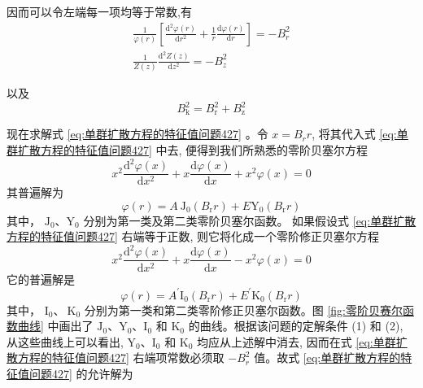 \documentclass{Sichuan Normal University}
\begin{document}
因而可以令左端每一项均等于常数,有
\begin{align}
\frac{1}{\varphi(r)}\left[\frac{\mathrm{d}^2 \varphi(r)}{\mathrm{d} r^2}+\frac{1}{r} \frac{\mathrm{d} \varphi(r)}{\mathrm{d} r}\right]=-B_r^2 \label{eq:单群扩散方程的特征值问题427}\\
\frac{1}{Z(z)} \frac{\mathrm{d}^2 Z(z)}{\mathrm{d} z^2}=-B_z^2\label{eq:单群扩散方程的特征值问题428}
\end{align}

以及
\begin{equation}
B_{\mathrm{k}}^2=B_{\mathrm{r}}^2+B_{\mathrm{z}}^2
\end{equation}

现在求解式 \eqref{eq:单群扩散方程的特征值问题427} 。令 $x=B_r r$, 将其代入式 \eqref{eq:单群扩散方程的特征值问题427} 中去, 便得到我们所熟悉的零阶贝塞尔方程
\begin{equation}
x^2 \frac{\mathrm{d}^2 \varphi(x)}{\mathrm{d} x^2}+x \frac{\mathrm{d} \varphi(x)}{\mathrm{d} x}+x^2 \varphi(x)=0
\end{equation}
其普遍解为
\begin{equation}
\varphi(r)=A \mathrm{~J}_0\left(B_{\mathrm{r}} r\right)+E \mathrm{Y}_0\left(B_{\mathrm{r}} r\right)
\end{equation}其中， $\mathrm{J}_0 、 \mathrm{Y}_0$ 分别为第一类及第二类零阶贝塞尔函数。
如果假设式 \eqref{eq:单群扩散方程的特征值问题427} 右端等于正数, 则它将化成一个零阶修正贝塞尔方程
\begin{equation}
x^2 \frac{\mathrm{d}^2 \varphi(x)}{\mathrm{d} x^2}+x \frac{\mathrm{d} \varphi(x)}{\mathrm{d} x}-x^2 \varphi(x)=0
\end{equation}
它的普遍解是
\begin{equation}
\varphi(r)=A^{\prime} \mathrm{I}_0\left(B_{\mathrm{r}} r\right)+E^{\prime} \mathrm{K}_0\left(B_{\mathrm{r}} r\right)
\end{equation}其中， $\mathrm{I}_0 、 \mathrm{~K}_0$ 分别为第一类和第二类零阶修正贝塞尔函数。图 \ref{fig:零阶贝赛尔函数曲线} 中画出了 $\mathrm{J}_0 、 \mathrm{Y}_0 、 \mathrm{I}_0$ 和 $\mathrm{K}_0$ 的曲线。根据该问题的定解条件 (1) 和 (2), 从这些曲线上可以看出, $\mathrm{Y}_0 、 \mathrm{I}_0$ 和 $\mathrm{K}_0$ 均应从上述解中消去, 因而在式 \eqref{eq:单群扩散方程的特征值问题427} 右端项常数必须取 $-B_r^2$ 值。故式 \eqref{eq:单群扩散方程的特征值问题427} 的允许解为
\end{document}
